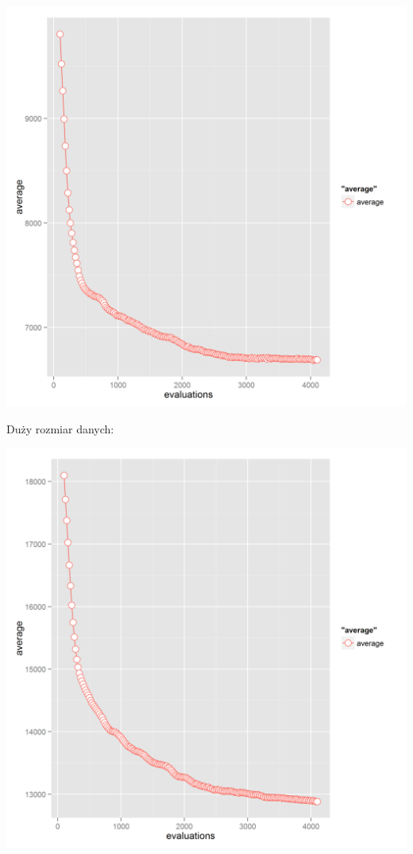 \includegraphics[]{simple_graph1.png}

Duży rozmiar danych:

\includegraphics[]{simple_graph2.png}

